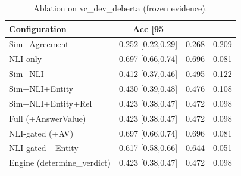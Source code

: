 \begin{table}[t]
\centering
\caption{Ablation on vc_dev_deberta (frozen evidence).}
\label{tab:ablation_vc_dev_deberta}
\small
\begin{tabular}{lccc}
\hline
Configuration & Acc [95\\%
\hline
Sim+Agreement & 0.252 [0.22,0.29] & 0.268 & 0.209 \\
NLI only & 0.697 [0.66,0.74] & 0.696 & 0.081 \\
Sim+NLI & 0.412 [0.37,0.46] & 0.495 & 0.122 \\
Sim+NLI+Entity & 0.430 [0.39,0.48] & 0.476 & 0.108 \\
Sim+NLI+Entity+Rel & 0.423 [0.38,0.47] & 0.472 & 0.098 \\
Full (+AnswerValue) & 0.423 [0.38,0.47] & 0.472 & 0.098 \\
NLI-gated (+AV) & 0.697 [0.66,0.74] & 0.696 & 0.081 \\
NLI-gated +Entity & 0.617 [0.58,0.66] & 0.644 & 0.051 \\
Engine (determine\_verdict) & 0.423 [0.38,0.47] & 0.472 & 0.098 \\
\hline
\end{tabular}
\end{table}